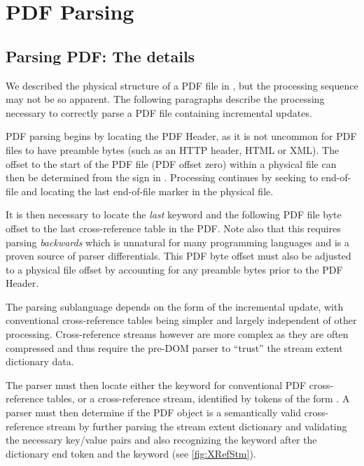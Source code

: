 \section{PDF Parsing}
\label{sec:parsing}

 

\subsection{Parsing PDF: The details}
\label{sec:parsingfile}

We described the physical structure of a PDF file in ,
but the processing sequence may not be so apparent.
The following paragraphs describe the processing necessary to correctly parse a PDF file containing incremental updates.

PDF parsing begins by locating the PDF Header, as it is not uncommon for PDF files to have 
preamble bytes (such as an HTTP header, HTML or XML). The offset to the start of the PDF file 
(PDF offset zero)
within a physical file can then be determined from the \lstcd{\%} sign in . 
Processing continues by seeking to end-of-file and locating the last end-of-file marker  in the physical file.

It is then necessary to locate the \emph{last}  keyword and the following PDF file byte offset 
to the last cross-reference table in the PDF. Note also that this requires parsing \emph{backwards}
which is unnatural for many programming languages and is a proven source of parser differentials. 
This PDF byte offset must also be adjusted to a physical file offset by accounting for any preamble bytes prior to the PDF Header.

The parsing sublanguage depends on the form of the incremental update, with
conventional cross-reference tables being simpler and largely independent of
other processing. Cross-reference streams however are more complex as they are
often compressed and thus require the pre-DOM parser to ``trust'' the stream
extent dictionary data.

The parser must then locate either the  keyword for
conventional PDF cross-reference tables, or a cross-reference stream, identified by tokens of the form  . 
A parser must then determine if the PDF object is a
semantically valid cross-reference stream by further parsing the stream extent dictionary and 
validating the necessary key/value pairs and also recognizing the  keyword after the dictionary end token \lstcd{>>} and the  keyword (see \cref{fig:XRefStm}). 


